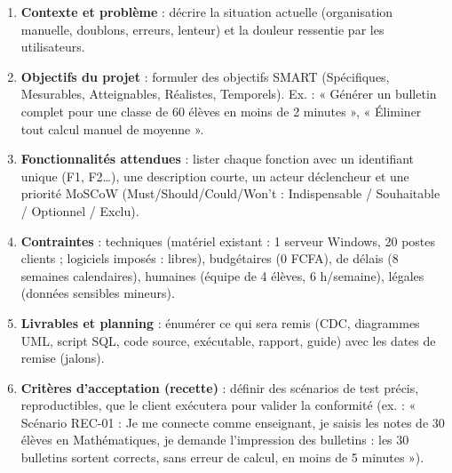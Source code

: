\documentclass[11pt]{article}
\newcommand{\cle}[1]{{\popxbold\color{popdark}#1}}
\begin{document}
\begin{methode}
\begin{enumerate}
\item \textbf{Contexte et problème} : décrire la situation actuelle (organisation manuelle, doublons, erreurs, lenteur) et la douleur ressentie par les utilisateurs.
\item \textbf{Objectifs du projet} : formuler des objectifs \cle{SMART} (Spécifiques, Mesurables, Atteignables, Réalistes, Temporels). Ex. : « Générer un bulletin complet pour une classe de 60 élèves en moins de 2 minutes », « Éliminer tout calcul manuel de moyenne ».
\item \textbf{Fonctionnalités attendues} : lister chaque fonction avec un identifiant unique (F1, F2\ldots), une description courte, un acteur déclencheur et une priorité \cle{MoSCoW} (Must/Should/Could/Won't : Indispensable / Souhaitable / Optionnel / Exclu).
\item \textbf{Contraintes} : techniques (matériel existant : 1 serveur Windows, 20 postes clients ; logiciels imposés : libres), budgétaires (0 FCFA), de délais (8 semaines calendaires), humaines (équipe de 4 élèves, 6 h/semaine), légales (données sensibles mineurs).
\item \textbf{Livrables et planning} : énumérer ce qui sera remis (CDC, diagrammes UML, script SQL, code source, exécutable, rapport, guide) avec les dates de remise (jalons).
\item \textbf{Critères d'acceptation (recette)} : définir des scénarios de test précis, reproductibles, que le client exécutera pour valider la conformité (ex. : « Scénario REC-01 : Je me connecte comme enseignant, je saisis les notes de 30 élèves en Mathématiques, je demande l'impression des bulletins : les 30 bulletins sortent corrects, sans erreur de calcul, en moins de 5 minutes »).
\end{enumerate}
\end{methode}
\end{document}
